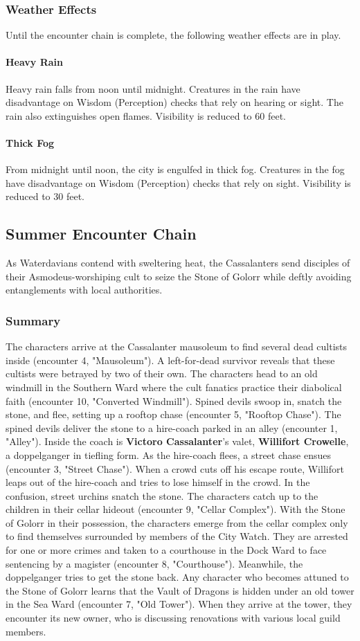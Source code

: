 \documentclass[10pt,a4paper,twoside,twocolumn,openany,nodeprecatedcode]{dndbook}
\begin{document}
\subsubsection{Weather Effects}
Until the encounter chain is complete, the following weather effects are in play.
\paragraph{Heavy Rain}
Heavy rain falls from noon until midnight. Creatures in the rain have disadvantage on Wisdom (Perception) checks that rely on hearing or sight. The rain also extinguishes open flames. Visibility is reduced to 60 feet.
\paragraph{Thick Fog}
From midnight until noon, the city is engulfed in thick fog. Creatures in the fog have disadvantage on Wisdom (Perception) checks that rely on sight. Visibility is reduced to 30 feet.
\subsection{Summer Encounter Chain}
As Waterdavians contend with sweltering heat, the Cassalanters send disciples of their Asmodeus-worshiping cult to seize the Stone of Golorr while deftly avoiding entanglements with local authorities.
\subsubsection{Summary}
The characters arrive at the Cassalanter mausoleum to find several dead cultists inside (encounter 4, "Mausoleum"). A left-for-dead survivor reveals that these cultists were betrayed by two of their own. The characters head to an old windmill in the Southern Ward where the cult fanatics practice their diabolical faith (encounter 10, "Converted Windmill"). Spined devils swoop in, snatch the stone, and flee, setting up a rooftop chase (encounter 5, "Rooftop Chase").
The spined devils deliver the stone to a hire-coach parked in an alley (encounter 1, "Alley"). Inside the coach is \textbf{Victoro Cassalanter}'s valet, \textbf{Willifort Crowelle}, a doppelganger in tiefling form. As the hire-coach flees, a street chase ensues (encounter 3, "Street Chase"). When a crowd cuts off his escape route, Willifort leaps out of the hire-coach and tries to lose himself in the crowd. In the confusion, street urchins snatch the stone. The characters catch up to the children in their cellar hideout (encounter 9, "Cellar Complex").
With the Stone of Golorr in their possession, the characters emerge from the cellar complex only to find themselves surrounded by members of the City Watch. They are arrested for one or more crimes and taken to a courthouse in the Dock Ward to face sentencing by a magister (encounter 8, "Courthouse"). Meanwhile, the doppelganger tries to get the stone back.
Any character who becomes attuned to the Stone of Golorr learns that the Vault of Dragons is hidden under an old tower in the Sea Ward (encounter 7, "Old Tower"). When they arrive at the tower, they encounter its new owner, who is discussing renovations with various local guild members.
\end{document}
